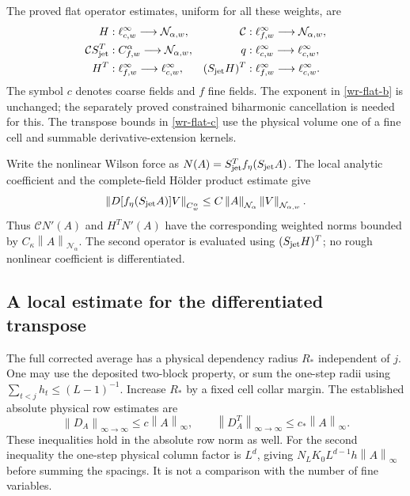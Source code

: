 \documentclass[11pt]{article}
\theoremstyle{remark}
\newcommand{\norm}[1]{\left\|#1\right\|}
\begin{document}
The proved flat operator estimates, uniform for all these weights,
are
\begin{align}
 H &: \ell^\infty_{c,w}\longrightarrow\mathcal N_{\alpha,w},&
 \mathcal C &: \ell^\infty_{f,w}\longrightarrow\mathcal N_{\alpha,w},
                                                       \label{wr-flat-a}\\
 \mathcal C S_{\rm jet}^T &: C^\alpha_{f,w}\longrightarrow\mathcal N_{\alpha,w},
 &q &: \ell^\infty_{c,w}\longrightarrow\ell^\infty_{c,w},
                                                       \label{wr-flat-b}\\
 H^T &: \ell^\infty_{f,w}\longrightarrow\ell^\infty_{c,w},&
 (S_{\rm jet}H)^T &: \ell^\infty_{f,w}\longrightarrow\ell^\infty_{c,w}.
                                                       \label{wr-flat-c}
\end{align}
The symbol $c$ denotes coarse fields and $f$ fine fields.
The exponent in \eqref{wr-flat-b} is unchanged; the separately
proved constrained biharmonic cancellation is needed for this.
The transpose bounds in \eqref{wr-flat-c} use the physical volume
one of a fine cell and summable derivative-extension kernels.

Write the nonlinear Wilson force as
$N(A)=S_{\rm jet}^Tf_\eta(S_{\rm jet}A)$. The local analytic
coefficient and the complete-field H\"older product estimate give
\begin{equation}\label{wr-force}
 \norm{D[f_\eta(S_{\rm jet}A)]V}_{C^\alpha_w}
 \le C\norm{A}_{\mathcal N_\alpha}
                   \norm{V}_{\mathcal N_{\alpha,w}}.
\end{equation}
Thus $\mathcal C N'(A)$ and $H^TN'(A)$ have the corresponding
weighted norms bounded by $C_\kappa\norm{A}_{\mathcal N_\alpha}$.
The second operator is evaluated using $(S_{\rm jet}H)^T$;
no rough nonlinear coefficient is differentiated.

\subsection{A local estimate for the differentiated transpose}
\label{wr-local-transpose}

The full corrected average has a physical dependency radius
$R_*$ independent of $j$. One may use the deposited two-block
property, or sum the one-step radii using
$\sum_{t<j}h_t\le(L-1)^{-1}$. Increase $R_*$ by a fixed cell
collar margin. The established absolute physical row estimates are
\begin{equation}\label{wr-row-estimates}
 \norm{D_A}_{\infty\to\infty}\le c\norm{A}_\infty,
 \qquad
 \norm{D_A^T}_{\infty\to\infty}\le c_*\norm{A}_\infty.
\end{equation}
These inequalities hold in the absolute row norm as well.
For the second inequality the one-step physical column factor
is $L^d$, giving
$N_LK_0L^{d-1}h\norm{A}_\infty$ before summing the spacings.
It is not a comparison with the number of fine variables.
\end{document}
